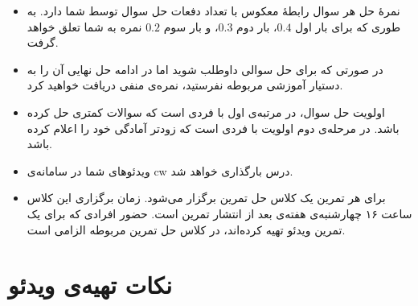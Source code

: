 \begin{itemize}[itemsep=1em, parsep=0.5em]
    \item
    نمرهٔ حل هر سوال رابطهٔ معکوس با تعداد دفعات حل سوال توسط شما دارد. به طوری که برای بار اول
    $0.4$،
     بار دوم
    $0.3$،
    و بار سوم
    $0.2$
    نمره به شما تعلق خواهد گرفت.

    \item
    در صورتی که برای حل سوالی داوطلب شوید اما در ادامه حل نهایی آن را به دستیار آموزشی مربوطه نفرستید، نمره‌ی منفی دریافت خواهید کرد.

    \item
    اولویت حل سوال، در مرتبه‌ی اول با فردی است که سوالات کمتری حل کرده باشد. در مرحله‌ی دوم اولویت با فردی است که زودتر آمادگی خود را اعلام کرده باشد.

    \item
    ویدئوهای شما در سامانه‌ی cw درس بارگذاری خواهد شد.

    \item
    برای هر تمرین یک کلاس حل تمرین برگزار می‌شود. زمان برگزاری این کلاس ساعت ۱۶ چهارشنبه‌ی هفته‌ی بعد از انتشار تمرین است. حضور افرادی که برای یک تمرین ویدئو تهیه کرده‌اند، در کلاس حل تمرین مربوطه الزامی است.

\end{itemize}

\section{نکات تهیه‌ی ویدئو}

